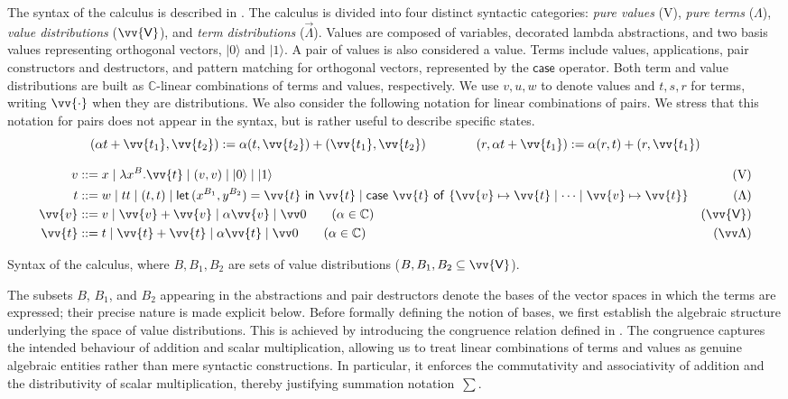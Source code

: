 \documentclass[runningheads,orivec,envcountsame,envcountsect]{llncs}
\newcommand\ket[1]{\ensuremath{|#1\rangle}}
\newcommand\s[1]{\ensuremath{\mathsf{#1}}}
\newcommand\Val{{\s V}}
\DeclareRobustCommand{\ValD}{\ensuremath{\vv{\mathsf{V}}}}
\def\C{\mathbb{C}}            %
\def\Val{\mathrm{V}}          %
\def\Pair#1#2{(#1,#2)} %
\def\Lam#1#2#3{\lambda#1^{#2}{.}#3} %
\def\letkeyword{\mathsf{let}}
\def\inkeyword{\mathsf{in}}
\def\LetP#1#2#3#4#5#6{\letkeyword\,\Pair{#1^{#2}}{#3^{#4}}=#5~\inkeyword~#6}
\def\gencase#1#2#3#4#5{\ensuremath{\mathsf{case}~#1~\mathsf{of}~\{#2\mapsto #4 \mid \dotsb \mid #3\mapsto #5\}}}
\begin{document}
The syntax of the calculus is described in
. The calculus is divided into four
distinct syntactic categories: \emph{pure values} ($\Val$), \emph{pure terms}
($\Lambda$), \emph{value distributions} ($\ValD$), and \emph{term
distributions} ($\vec\Lambda$). Values are composed of variables, decorated
lambda abstractions, and two basis values representing orthogonal vectors,
$\ket 0$ and $\ket 1$. A pair of values is also considered a value.  Terms
include values, applications, pair constructors and destructors, and pattern
matching for orthogonal vectors, represented by the $\mathsf{case}$ operator.
Both term and value distributions are built as $\C$-linear combinations of
terms and values, respectively. 
We use $v,u,w$ to denote values and $t,s,r$ for terms, writing $\vv{\cdot}$ when
they are distributions.
We also consider the following notation for linear combinations of
pairs. We stress that this notation for pairs does not appear in the syntax,
but is rather useful to describe specific states.
  \[
    \Pair{\alpha  t+\vv{t_1}}{\vv{t_2}} 
    := \alpha\Pair{t}{\vv{t_2}} + \Pair{\vv{t_1}}{\vv{t_2}}
    \qquad\qquad
    \Pair{r}{\alpha  t+\vv{t_1}} 
    := \alpha\Pair{r}{t} + \Pair{r}{\vv{t_1}}
  \]

\begin{table}[t]
  \begin{align*}
    v &::= x \mid \Lam{x}B{\vv{t}} \mid (v, v) \mid \ket{0} \mid \ket{1} &
    (\Val)\\
    t &::= w \mid tt \mid (t,t) \mid
    \LetP{x}{B_1}{y}{B_2}{\vv{t}}{\vv{t}}\mid
    \gencase{\vv{t}}{\vv{v}}{\vv{v}}{\vv{t}}{\vv{t}} &
    (\Lambda) \\
    \vv{v} &::= v \mid \vv{v}+\vv{v} \mid \alpha \vv{v} \mid \vv 0
    \qquad\hfill(\alpha\in\C) & (\ValD) \\
    \vv{t} &::= t \mid \vv{t}+\vv{t} \mid \alpha \vv{t} \mid \vv 0
    \qquad\hfill(\alpha\in\C) & (\vv \Lambda)
  \end{align*}
  \caption{Syntax of the calculus, where $B, B_1, B_2$ are sets of value
  distributions ($B, B_1, B_2 \subseteq \ValD$).}
  \label{tab:Syntax}
\end{table}


The subsets $B$, $B_1$, and $B_2$ appearing in the abstractions and pair
destructors denote the bases of the vector spaces in which the terms are
expressed; their precise nature is made explicit below.
Before formally defining the notion of bases, we first establish the
algebraic structure underlying the space of value distributions.
This is achieved by introducing the congruence relation defined in
.
The congruence captures the intended behaviour of addition and scalar
multiplication, allowing us to treat linear combinations of terms and values
as genuine algebraic entities rather than mere syntactic constructions.
In particular, it enforces the commutativity and associativity of addition and
the distributivity of scalar multiplication, thereby justifying summation
notation~$\sum$.
\end{document}
